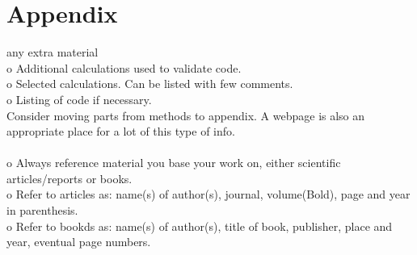 \documentclass[ 12pt, a4paper ]{article}
\begin{document}
\section{Appendix}
    any extra material \\
    o   Additional calculations used to validate code. \\
    o   Selected calculations. Can be listed with few comments. \\
    o   Listing of code if necessary. \\
    Consider moving parts from methods to appendix. A webpage is also an appropriate place
    for a lot of this type of info. \\\\

    o   Always reference material you base your work on, either scientific articles/reports
        or books. \\
    o   Refer to articles as: name(s) of author(s), journal, volume(Bold), page and year in
        parenthesis. \\
    o   Refer to bookds as: name(s) of author(s), title of book, publisher, place and year, 
        eventual page numbers. \\
\end{document}
